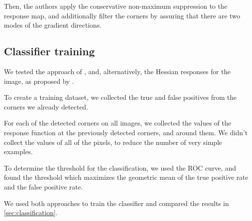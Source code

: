 Then, the authors apply the conservative non-maximum suppression to the
response map, and additionally filter the corners by assuring that there are two
modes of the gradient directions.

%
%
%
%
%

\subsection{Classifier training}\label{sub:classifier_training}

We tested the approach of \cite{geigerAutomaticCameraRange2012}, and,
alternatively, the Hessian responses for the image, as proposed by
\cite{chenNewSubPixelDetector2005}.

To create a training dataset, we collected the true and false positives from the
corners we already detected.

For each of the detected corners on all images, we collected the values of the
response function at the previously detected corners, and around them.
We didn't collect the values of all of the pixels, to reduce the number
of very simple examples.

To determine the threshold for the classification, we used the ROC curve, and
found the threshold which maximizes
the geometric mean of the true positive rate and the false positive rate.

We used both approaches to train the classifier and compared the
results in \cref{sec:classification}.

